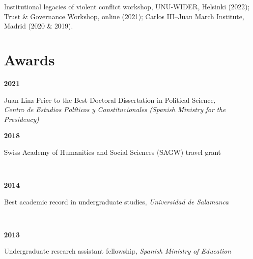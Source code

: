 \documentclass[a4paper, 12pt]{article}
\begin{document}
Institutional legacies of violent conflict workshop, UNU-WIDER, Helsinki (2022); Trust \& Governance Workshop, online (2021); Carlos III--Juan March Institute, Madrid (2020 \& 2019).

\section*{Awards}


\begin{minipage}[t]{0.1\textwidth}
\textbf{2021}
\end{minipage}\hfill\begin{minipage}[t]{0.9\textwidth}
Juan Linz Price to the Best Doctoral Dissertation in Political Science,\\\textit{Centro de Estudios Políticos y Constitucionales (Spanish Ministry for the Presidency)}\\\vspace{-8pt}
\end{minipage}
\begin{minipage}[t]{0.1\textwidth}
\textbf{2018}
\end{minipage}\hfill\begin{minipage}[t]{0.9\textwidth}
Swiss Academy of Humanities and Social Sciences (SAGW) travel grant
\end{minipage}\\
\begin{minipage}[t]{0.1\textwidth}
\textbf{2014}
\end{minipage}\hfill\begin{minipage}[t]{0.9\textwidth}
Best academic record in undergraduate studies, {\it Universidad de Salamanca}
\end{minipage}\\
\begin{minipage}[t]{0.1\textwidth}
\textbf{2013}
\end{minipage}\hfill\begin{minipage}[t]{0.9\textwidth}
Undergraduate research assistant fellowship, {\it Spanish Ministry of Education}
\end{minipage}\\
\end{document}
